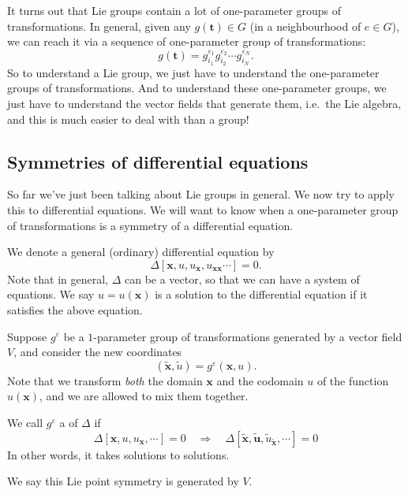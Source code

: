 \documentclass[a4paper]{article}
\begin{document}
It turns out that Lie groups contain a lot of one-parameter groups of transformations. In general, given any $g(\mathbf{t}) \in G$ (in a neighbourhood of $e \in G$), we can reach it via a sequence of one-parameter group of transformations:
\[
  g(\mathbf{t}) = g_{i_1}^{\varepsilon_1} g_{i_2}^{\varepsilon_2} \cdots g_{i_N}^{\varepsilon_N}.
\]
So to understand a Lie group, we just have to understand the one-parameter groups of transformations. And to understand these one-parameter groups, we just have to understand the vector fields that generate them, i.e.\ the Lie algebra, and this is much easier to deal with than a group!

\subsection{Symmetries of differential equations}
So far we've just been talking about Lie groups in general. We now try to apply this to differential equations. We will want to know when a one-parameter group of transformations is a symmetry of a differential equation.

We denote a general (ordinary) differential equation by
\[
  \Delta[\mathbf{x}, u, u_\mathbf{x}, u_{\mathbf{x}\mathbf{x}} \cdots] = 0.
\]
Note that in general, $\Delta$ can be a vector, so that we can have a system of equations. We say $u = u(\mathbf{x})$ is a solution to the differential equation if it satisfies the above equation.

Suppose $g^\varepsilon$ be a $1$-parameter group of transformations generated by a vector field $V$, and consider the new coordinates
\[
  (\tilde{\mathbf{x}}, \tilde{u}) = g^\varepsilon(\mathbf{x}, u).
\]
Note that we transform \emph{both} the domain $\mathbf{x}$ and the codomain $u$ of the function $u(\mathbf{x})$, and we are allowed to mix them together.

We call $g^\varepsilon$ a  of $\Delta$ if
\[
  \Delta [\mathbf{x}, u, u_{\mathbf{x}}, \cdots] = 0 \quad\Longrightarrow\quad \Delta[\tilde{\mathbf{x}}, \tilde{\mathbf{u}}, \tilde{u}_{\tilde{\mathbf{x}}}, \cdots] = 0
\]
In other words, it takes solutions to solutions.

We say this Lie point symmetry is generated by $V$.
\end{document}
